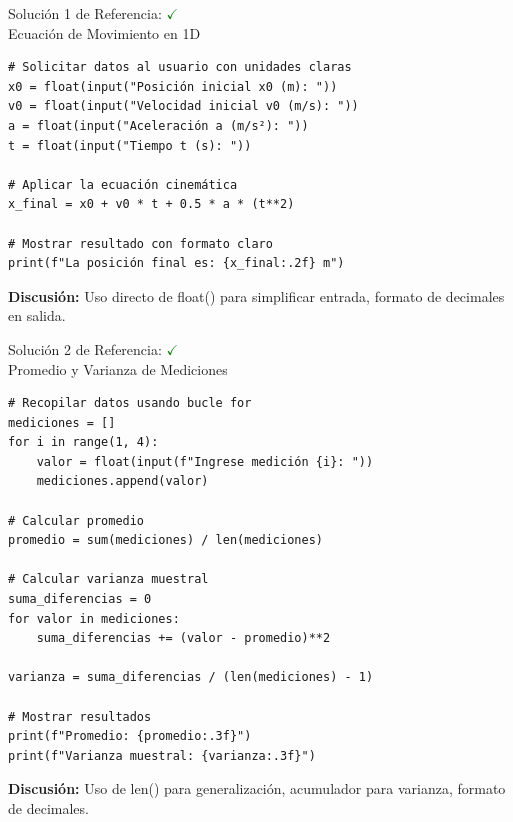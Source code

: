 \documentclass[10pt]{beamer}
\newif\ifshowsolutions
\begin{document}
\ifshowsolutions
\begin{frame}[fragile]{Solución 1 de Referencia: \hfill \textcolor{green}{$\checkmark$} \\ Ecuación de Movimiento en 1D}
\begin{verbatim}
# Solicitar datos al usuario con unidades claras
x0 = float(input("Posición inicial x0 (m): "))
v0 = float(input("Velocidad inicial v0 (m/s): "))
a = float(input("Aceleración a (m/s²): "))
t = float(input("Tiempo t (s): "))

# Aplicar la ecuación cinemática
x_final = x0 + v0 * t + 0.5 * a * (t**2)

# Mostrar resultado con formato claro
print(f"La posición final es: {x_final:.2f} m")
\end{verbatim}
\textbf{Discusión:} Uso directo de float() para simplificar entrada, formato de decimales en salida.
\end{frame}

\begin{frame}[fragile]{Solución 2 de Referencia: \hfill \textcolor{green}{$\checkmark$} \\ Promedio y Varianza de Mediciones}
\begin{verbatim}
# Recopilar datos usando bucle for
mediciones = []
for i in range(1, 4):
    valor = float(input(f"Ingrese medición {i}: "))
    mediciones.append(valor)

# Calcular promedio
promedio = sum(mediciones) / len(mediciones)

# Calcular varianza muestral
suma_diferencias = 0
for valor in mediciones:
    suma_diferencias += (valor - promedio)**2

varianza = suma_diferencias / (len(mediciones) - 1)

# Mostrar resultados
print(f"Promedio: {promedio:.3f}")
print(f"Varianza muestral: {varianza:.3f}")
\end{verbatim}
\textbf{Discusión:} Uso de len() para generalización, acumulador para varianza, formato de decimales.
\end{frame}
\end{document}
